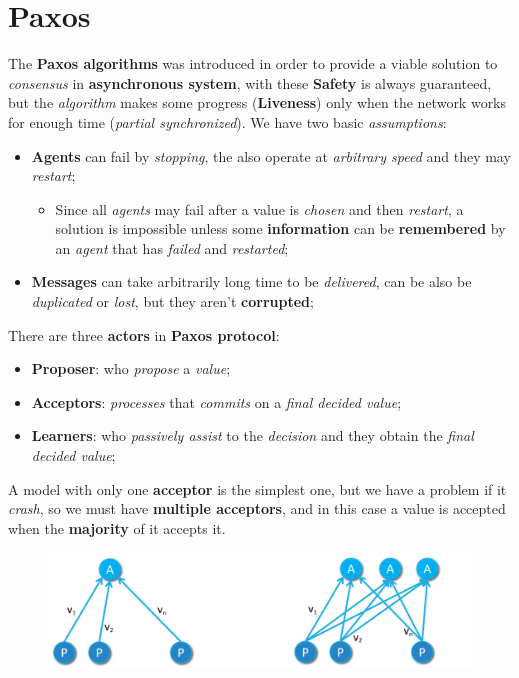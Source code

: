\documentclass{article}
\begin{document}
\section{Paxos}
The \textbf{Paxos algorithms} was introduced in order to provide a viable solution to \emph{consensus} in \textbf{asynchronous system}, with these \textbf{Safety} is always guaranteed, but the \emph{algorithm} makes some progress (\textbf{Liveness}) only when the network works for enough time (\emph{partial synchronized}). We have two basic \emph{assumptions}:
\begin{itemize}
\item \textbf{Agents} can fail by \emph{stopping}, the also operate at \emph{arbitrary speed} and they may \emph{restart};
\begin{itemize}
\item Since all \emph{agents} may fail after a value is \emph{chosen} and then \emph{restart}, a solution is impossible unless some \textbf{information} can be \textbf{remembered} by an \emph{agent} that has \emph{failed} and \emph{restarted};
\end{itemize}
\item \textbf{Messages} can take arbitrarily long time to be \emph{delivered}, can be also be \emph{duplicated} or \emph{lost}, but they aren't \textbf{corrupted};
\end{itemize}
There are three \textbf{actors} in \textbf{Paxos protocol}:
\begin{itemize}
\item \textbf{Proposer}: who \emph{propose} a \emph{value};
\item \textbf{Acceptors}: \emph{processes} that \emph{commits} on a \emph{final decided value};
\item \textbf{Learners}: who \emph{passively assist} to the \emph{decision} and they obtain the \emph{final decided value};
\end{itemize}
A model with only one \textbf{acceptor} is the simplest one, but we have a problem if it \emph{crash}, so we must have \textbf{multiple acceptors}, and in this case a value is accepted when the \textbf{majority} of it accepts it. 
\begin{figure}[H]
  \centering
  \includegraphics[scale=0.9]{cattura46.png}
\end{figure}
\end{document}
